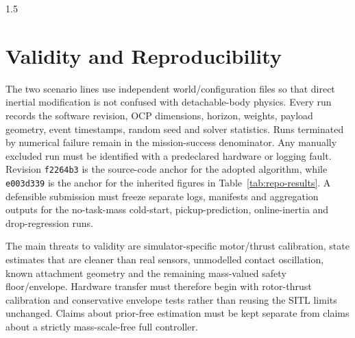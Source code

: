 \begin{spacing}{1.5}
\section{Validity and Reproducibility}

The two scenario lines use independent world/configuration files so that direct inertial modification is not confused with detachable-body physics. Every run records the software revision, OCP dimensions, horizon, weights, payload geometry, event timestamps, random seed and solver statistics. Runs terminated by numerical failure remain in the mission-success denominator. Any manually excluded run must be identified with a predeclared hardware or logging fault. Revision \texttt{f2264b3} is the source-code anchor for the adopted algorithm, while \texttt{e003d339} is the anchor for the inherited figures in Table~\ref{tab:repo-results}. A defensible submission must freeze separate logs, manifests and aggregation outputs for the no-task-mass cold-start, pickup-prediction, online-inertia and drop-regression runs.

The main threats to validity are simulator-specific motor/thrust calibration, state estimates that are cleaner than real sensors, unmodelled contact oscillation, known attachment geometry and the remaining mass-valued safety floor/envelope. Hardware transfer must therefore begin with rotor-thrust calibration and conservative envelope tests rather than reusing the SITL limits unchanged. Claims about prior-free estimation must be kept separate from claims about a strictly mass-scale-free full controller.

\end{spacing}
\newpage
